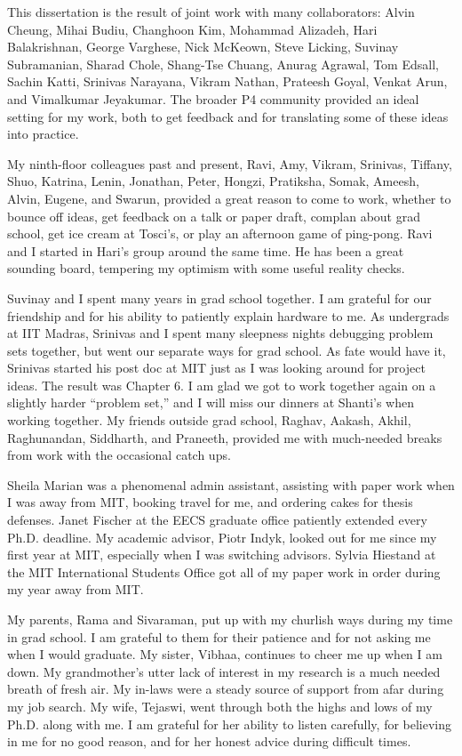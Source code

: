 This dissertation is the result of joint work with many collaborators: Alvin
Cheung, Mihai Budiu, Changhoon Kim, Mohammad Alizadeh, Hari Balakrishnan,
George Varghese, Nick McKeown, Steve Licking, Suvinay Subramanian, Sharad
Chole, Shang-Tse Chuang, Anurag Agrawal, Tom Edsall, Sachin Katti, Srinivas
Narayana, Vikram Nathan, Prateesh Goyal, Venkat Arun, and Vimalkumar Jeyakumar.
The broader P4 community provided an ideal setting for my work, both to get
feedback and for translating some of these ideas into practice. 

My ninth-floor colleagues past and present, Ravi, Amy, Vikram, Srinivas,
Tiffany, Shuo, Katrina, Lenin, Jonathan, Peter, Hongzi, Pratiksha, Somak,
Ameesh, Alvin, Eugene, and Swarun, provided a great reason to come to work,
whether to bounce off ideas, get feedback on a talk or paper draft, complan about grad school, get ice cream at
Tosci's, or play an afternoon game of ping-pong. Ravi and I started in Hari's
group around the same time. He has been a great sounding board, tempering
my optimism with some useful reality checks.

Suvinay and I spent many years in grad school together.  I am grateful for our
friendship and for his ability to patiently explain hardware to me. As
undergrads at IIT Madras, Srinivas and I spent many sleepness nights debugging
problem sets together, but went our separate ways for grad school. As fate
would have it, Srinivas started his post doc at MIT just as I was looking
around for project ideas. The result was Chapter 6. I am glad we got to work
together again on a slightly harder ``problem set,'' and I will miss our
dinners at Shanti's when working together.  My friends outside grad school,
Raghav, Aakash, Akhil, Raghunandan, Siddharth, and Praneeth, provided me with
much-needed breaks from work with the occasional catch ups.

Sheila Marian was a phenomenal admin assistant, assisting with paper work when
I was away from MIT, booking travel for me, and ordering cakes for thesis
defenses. Janet Fischer at the EECS graduate office patiently extended every
Ph.D.  deadline. My academic advisor, Piotr Indyk, looked out for me since my
first year at MIT, especially when I was switching advisors.  Sylvia Hiestand
at the MIT International Students Office got all of my paper work in order
during my year away from MIT.

My parents, Rama and Sivaraman, put up with my churlish ways during my time in
grad school. I am grateful to them for their patience and for not asking me
when I would graduate. My sister, Vibhaa, continues to cheer me up when I am
down.  My grandmother's utter lack of interest in my research is a much needed
breath of fresh air. My in-laws were a steady source of support from afar
during my job search. My wife, Tejaswi, went through both the highs and lows of
my Ph.D. along with me. I am grateful for her ability to listen carefully, for
believing in me for no good reason, and for her honest advice during difficult
times. 

